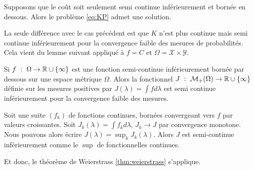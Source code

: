 \documentclass[a4paper,12pt]{article}
\begin{document}
\begin{proposition}
Supposons que le coût soit seulement semi continue inférieurement et bornée en dessous. Alors le problème \eqref{eq:KP} admet une solution. 
\end{proposition}
\begin{preuve}
La seule différence avec le cas précédent est que $K$ n'est plus continue mais semi continue inférieurement pour la convergence faible des mesures de probabilités. Cela vient du lemme suivant appliqué à $f = C$ et $\Omega = \mathcal{X}\times\mathcal{Y}$.
\begin{lemme}
Si $f\ :\ \Omega\rightarrow \mathbb{R}\cup\{\infty\}$ est une fonction semi-continue inférieurement bornée par dessous sur une espace métrique $\Omega$. Alors la fonctionnel $J \ :\ \mathcal{M}_+(\Omega )\rightarrow \RR\cup\{\infty\}$ définie sur les mesures positives par $J(\lambda) =\int f d\lambda$ est semi continue inférieurement pour la convergence faible des mesures. 
\end{lemme}
\begin{preuve}
Soit une suite $(f_k)$ de fonctions continues, bornées convergeant vers $f$ par valeurs croissantes. 
Soit $J_k(\lambda ) =\int f_k d\lambda$, $J_k\rightarrow J$ par convergence monotone. Nous pouvons alors écrire $J(\lambda )=\sup_k J_k(\lambda )$.
Alors $J$ est semi-continue inférieurement comme le $\sup$ de fonctionnelles continues.
\end{preuve}
Et donc, le théorème de Weierstrass \eqref{thm:weierstrass} s'applique.
\end{preuve}
\end{document}
